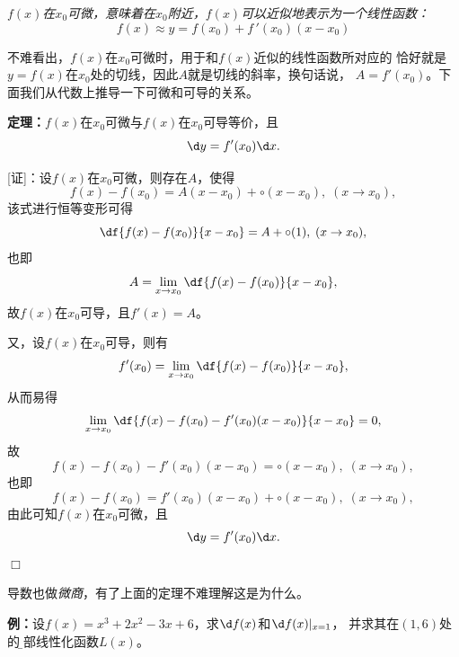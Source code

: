 \begin{center}

	\it $f(x)$在$x_0$可微，意味着在$x_0$附近，$f(x)$可以近似地表示为一个线性函数： 
	$$f(x)\approx y= f(x_0)+f\,'(x_0)(x-x_0)$$
\end{center}

不难看出，$f(x)$在$x_0$可微时，用于和$f(x)$近似的线性函数所对应的
恰好就是$y=f(x)$在$x_0$处的切线，因此$A$就是切线的斜率，换句话说，
$A=f'(x_0)$。下面我们从代数上推导一下可微和可导的关系。

{\bf 定理：}$f(x)$在$x_0$可微与$f(x)$在$x_0$可导等价，且
$$\d y =f'(x_0)\d x.$$

[证]：设$f(x)$在$x_0$可微，则存在$A$，使得
$$f(x)-f(x_0)=A(x-x_0)+\circ(x-x_0),\;(x\to x_0),$$
该式进行恒等变形可得
$$\df{f(x)-f(x_0)}{x-x_0}=A+\circ(1),\;(x\to x_0),$$
也即
$$A=\lim\limits_{x\to x_0}\df{f(x)-f(x_0)}{x-x_0},$$
故$f(x)$在$x_0$可导，且$f'(x)=A$。

又，设$f(x)$在$x_0$可导，则有
$$f'(x_0)=\lim\limits_{x\to x_0}\df{f(x)-f(x_0)}{x-x_0},$$
从而易得
$$\lim\limits_{x\to x_0}\df{f(x)-f(x_0)
-f'(x_0)(x-x_0)}{x-x_0}=0,$$
故
$$f(x)-f(x_0)-f'(x_0)(x-x_0)=\circ(x-x_0),\;(x\to x_0),$$
也即
$$f(x)-f(x_0)=f'(x_0)(x-x_0)+\circ(x-x_0),\;(x\to x_0),$$
由此可知$f(x)$在$x_0$可微，且
$$\d y =f'(x_0)\d x.$$
\hfill$\Box$

导数也做{\it 微商}，有了上面的定理不难理解这是为什么。

{\bf 例：}设$f(x)=x^3+2x^2-3x+6$，求$\d f(x)$和$\d f(x)|_{x=1}$，
并求其在$(1,6)$处的{\b 局部线性化函数$L(x)$}。

